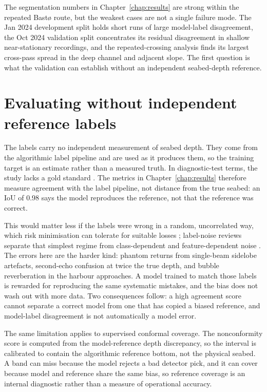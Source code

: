 \label{chap:discussion}

The segmentation numbers in Chapter~\ref{chap:results} are strong within the repeated Bast\o{} route, but the weakest cases are not a single failure mode. The Jan 2024 development split holds short runs of large model-label disagreement, the Oct 2024 validation split concentrates its residual disagreement in shallow near-stationary recordings, and the repeated-crossing analysis finds its largest cross-pass spread in the deep channel and adjacent slope. The first question is what the validation can establish without an independent seabed-depth reference.

\section{Evaluating without independent reference labels}
\label{sec:no-reference-labels}

The labels carry no independent measurement of seabed depth. They come from the algorithmic label pipeline and are used as it produces them, so the training target is an estimate rather than a measured truth. In diagnostic-test terms, the study lacks a gold standard \cite{rutjes_evaluation_2007}. The metrics in Chapter~\ref{chap:results} therefore measure agreement with the label pipeline, not distance from the true seabed: an IoU of 0.98 says the model reproduces the reference, not that the reference was correct.

This would matter less if the labels were wrong in a random, uncorrelated way, which risk minimisation can tolerate for suitable losses \cite{manwani_noise_2013}; label-noise reviews separate that simplest regime from class-dependent and feature-dependent noise \cite{karimi_deep_2020}. The errors here are the harder kind: phantom returns from single-beam sidelobe artefacts, second-echo confusion at twice the true depth, and bubble reverberation in the harbour approaches. A model trained to match those labels is rewarded for reproducing the same systematic mistakes, and the bias does not wash out with more data. Two consequences follow: a high agreement score cannot separate a correct model from one that has copied a biased reference, and model-label disagreement is not automatically a model error.

The same limitation applies to supervised conformal coverage. The nonconformity score is computed from the model-reference depth discrepancy, so the interval is calibrated to contain the algorithmic reference bottom, not the physical seabed. A band can miss because the model rejects a bad detector pick, and it can cover because model and reference share the same bias, so reference coverage is an internal diagnostic rather than a measure of operational accuracy.

